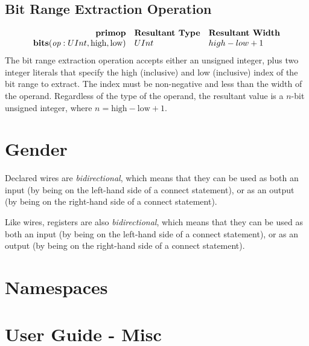 \documentclass[12pt]{article}
\begin{document}
\subsection{Bit Range Extraction Operation}
\[
\begin{array}{rll}
\text{\bf primop} & \text{\bf Resultant Type} & \text{\bf Resultant Width} \\
\text{\bf bits}(\text{\em op}:UInt, \text{high}, \text{low})  & UInt & high - low + 1    \\
\end{array}
\]
The bit range extraction operation accepts either an unsigned integer, plus two integer literals that specify the high (inclusive) and low (inclusive) index of the bit range to extract.
The index must be non-negative and less than the width of the operand.
Regardless of the type of the operand, the resultant value is a $n$-bit unsigned integer, where $n = \text{high} - \text{low} + 1$. 

\section{Gender}


Declared wires are {\em bidirectional}, which means that they can be used as both an input (by being on the left-hand side of a connect statement), or as an output (by being on the right-hand side of a connect statement).

Like wires, registers are also {\em bidirectional}, which means that they can be used as both an input (by being on the left-hand side of a connect statement), or as an output (by being on the right-hand side of a connect statement). 

\section{Namespaces}




\section{User Guide - Misc}
\end{document}
